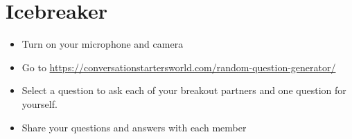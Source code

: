 \documentclass[14pt]{extarticle}
\begin{document}
\section*{Icebreaker}
\begin{itemize}
\item Turn on your microphone and camera
\item Go to \url{https://conversationstartersworld.com/random-question-generator/}
\item Select a question to ask each of your breakout partners and one question for yourself.
\item Share your questions and answers with each member
\end{itemize}
\end{document}
